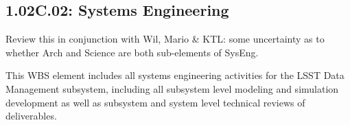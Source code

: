 \subsection{1.02C.02: Systems Engineering}

\begin{note}
Review this in conjunction with Wil, Mario \& KTL: some uncertainty as to
whether Arch and Science are both sub-elements of SysEng.
\end{note}

This WBS element includes all systems engineering activities for the LSST Data
Management subsystem, including all subsystem level modeling and simulation
development as well as subsystem and system level technical reviews of
deliverables.

